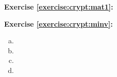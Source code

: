\noindent\textbf{Exercise \ref{exercise:crypt:mat1}:}

\noindent\textbf{Exercise \ref{exercise:crypt:minv}:}
\begin{multicols}{2}
\begin{enumerate}[(a)]
\item
\item
\item
\item
\end{enumerate}
\end{multicols}


 
